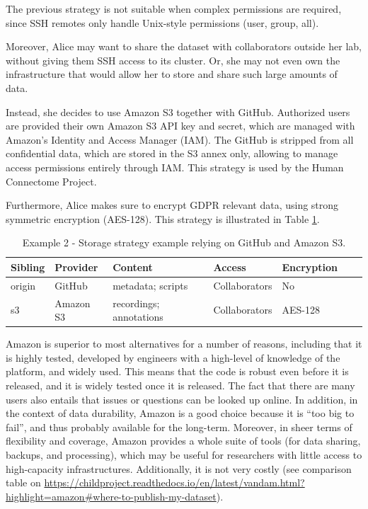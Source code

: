 \documentclass[smallextended]{svjour3}       %
\makeatletter
\newcommand\footnoteref[1]{\protected@xdef\@thefnmark{\ref{#1}}\@footnotemark}
\makeatother
\begin{document}
The previous strategy is not suitable when complex permissions are required, since SSH remotes only handle Unix-style permissions (user, group, all).

Moreover, Alice may want to share the dataset with collaborators outside her lab, without giving them SSH access to its cluster. Or, she may not even own the infrastructure that would allow her to store and share such large amounts of data. 

Instead, she decides to use Amazon S3 together with GitHub. Authorized users are provided their own Amazon S3 API key and secret, which are managed with Amazon's Identity and Access Manager (IAM). The GitHub is stripped from all confidential data, which are stored in the S3 annex only, allowing to manage access permissions entirely through IAM. This strategy is used by the Human Connectome Project\footnoteref{note:hcp}.

Furthermore, Alice makes sure to encrypt GDPR relevant data, using strong symmetric encryption (AES-128). This strategy is illustrated in Table \ref{table:storage2}.

\begin{table}[!htbp]
\centering
\begin{tabular}{@{}lllllll@{}}
\toprule
\textbf{Sibling} & \textbf{Provider} & \textbf{Content} & \textbf{Access} & \textbf{Encryption} \\ \midrule
origin   & GitHub     & metadata; scripts & Collaborators & No  \\
s3 & Amazon S3  &  recordings; annotations  & Collaborators  & AES-128 \\ \bottomrule
\end{tabular}
\caption{\label{table:storage2}Example 2 - Storage strategy example relying on GitHub and Amazon S3.}
\end{table}

Amazon is superior to most alternatives for a number of reasons, including that it is highly tested, developed by engineers with a high-level of knowledge of the platform, and widely used. This means that the code is robust even before it is released, and it is widely tested once it is released. The fact that there are many users also entails that issues or questions can be looked up online. In addition, in the context of data durability, Amazon is a good choice because it is ``too big to fail'', and thus probably available for the long-term. Moreover, in sheer terms of flexibility and coverage, Amazon provides a whole suite of tools (for data sharing, backups, and processing), which may be useful for researchers with little access to high-capacity infrastructures. Additionally, it is not very costly (see comparison table on \url{https://childproject.readthedocs.io/en/latest/vandam.html?highlight=amazon#where-to-publish-my-dataset}).
\end{document}
